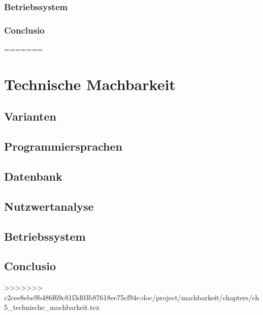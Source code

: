 \subsection {Betriebssystem}
\subsection {Conclusio}
=======
\chapter{Technische Machbarkeit}



\section{Varianten}

\section{Programmiersprachen}

\section{Datenbank}

\section{Nutzwertanalyse}

\section{Betriebssystem}

\section{Conclusio}

>>>>>>> c2cee8ebe9b486f69c81f3d03b87618ee75cf94e:doc/project/machbarkeit/chapters/ch5_technische_machbarkeit.tex
